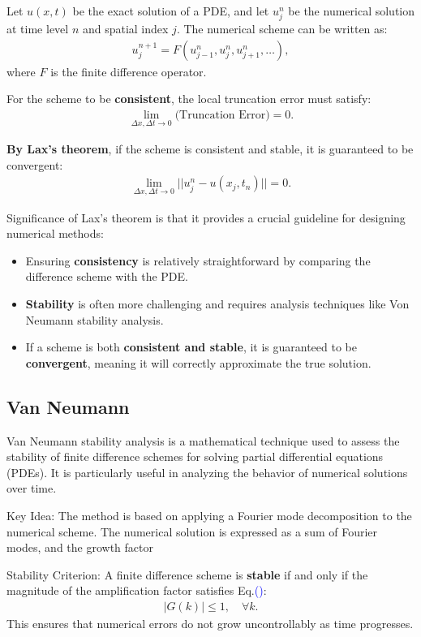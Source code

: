 \documentclass[fleqn,10pt]{SelfArx} %
\newcommand{\myeqref}[1]{Eq.\textcolor{blue}{\textup{(\getrefnumber{#1})}}}
\begin{document}
Let \( u(x,t) \) be the exact solution of a PDE, and let \( u^n_j \) be the numerical solution at time level \( n \) and spatial index \( j \). The numerical scheme can be written as:
\begin{align*}
    u^{n+1}_j = F(u^n_{j-1}, u^n_j, u^n_{j+1}, \dots),
\end{align*}
where \( F \) is the finite difference operator.

For the scheme to be \textbf{consistent}, the local truncation error must satisfy:
\begin{align*}
    \lim_{\Delta x, \Delta t \to 0} \text{(Truncation Error)} = 0.
\end{align*}

\textbf{By Lax's theorem}, if the scheme is consistent and stable, it is guaranteed to be convergent:
\begin{align*}
    \lim_{\Delta x, \Delta t \to 0} || u^n_j - u(x_j, t_n) || = 0.
\end{align*}

Significance of Lax’s theorem is that it provides a crucial guideline for designing numerical methods:
\begin{itemize}[noitemsep]
    \item Ensuring \textbf{consistency} is relatively straightforward by comparing the difference scheme with the PDE.
    \item \textbf{Stability} is often more challenging and requires analysis techniques like Von Neumann stability analysis.
    \item If a scheme is both \textbf{consistent and stable}, it is guaranteed to be \textbf{convergent}, meaning it will correctly approximate the true solution.
\end{itemize}

\subsection{Van Neumann}
Van Neumann stability analysis is a mathematical technique used to assess the stability of finite difference schemes for solving partial differential equations (PDEs). It is particularly useful in analyzing the behavior of numerical solutions over time.

Key Idea: The method is based on applying a Fourier mode decomposition to the numerical scheme. The numerical solution is expressed as a sum of Fourier modes, and the growth factor 

Stability Criterion: A finite difference scheme is \textbf{stable} if and only if the magnitude of the amplification factor satisfies \myeqref{eq:vanneumann}:
\begin{align*}
	|G(k)| \leq 1, \quad \forall k. \tag{10.1} \label{eq:vanneumann}
\end{align*}
This ensures that numerical errors do not grow uncontrollably as time progresses.
\end{document}

